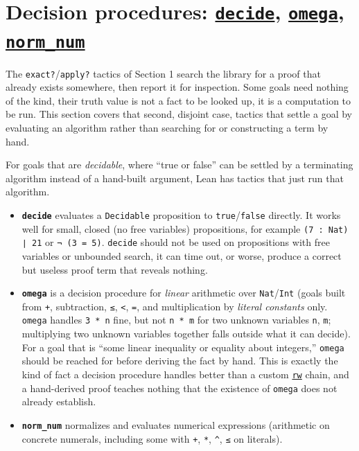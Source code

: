 \section{\texorpdfstring{Decision procedures: \href{https://lean-lang.org/doc/reference/latest/Tactic-Proofs/Tactic-Reference/}{\texttt{decide}}, \href{https://lean-lang.org/doc/reference/latest/Tactic-Proofs/Tactic-Reference/}{\texttt{omega}}, \href{https://lean-lang.org/doc/reference/latest/Tactic-Proofs/Tactic-Reference/}{\texttt{norm\_num}}}{Decision procedures: decide, omega, norm\_num}}\label{sec:13-working-efficiently:02-decision-procedures:1}

The \texttt{exact?}/\texttt{apply?} tactics of Section 1 search the library for a proof that already exists somewhere, then report it for inspection. Some goals need nothing of the kind, their truth value is not a fact to be looked up, it is a computation to be run. This section covers that second, disjoint case, tactics that settle a goal by evaluating an algorithm rather than searching for or constructing a term by hand.

For goals that are \emph{decidable}, where ``true or false'' can be settled by a terminating algorithm instead of a hand-built argument, Lean has tactics that just run that algorithm.

\begin{itemize}
\tightlist
\item
  \textbf{\texttt{decide}} evaluates a \texttt{Decidable} proposition to \texttt{true}/\texttt{false} directly. It works well for small, closed (no free variables) propositions, for example \texttt{(7 : Nat) ∣ 21} or \texttt{¬ (3 = 5)}. \texttt{decide} should not be used on propositions with free variables or unbounded search, it can time out, or worse, produce a correct but useless proof term that reveals nothing.
\item
  \textbf{\texttt{omega}} is a decision procedure for \emph{linear} arithmetic over \texttt{Nat}/\texttt{Int} (goals built from \texttt{+}, subtraction, \texttt{≤}, \texttt{<}, \texttt{=}, and multiplication by \emph{literal constants} only. \texttt{omega} handles \texttt{3 * n} fine, but not \texttt{n * m} for two unknown variables \texttt{n}, \texttt{m}; multiplying two unknown variables together falls outside what it can decide). For a goal that is ``some linear inequality or equality about integers,'' \texttt{omega} should be reached for before deriving the fact by hand. This is exactly the kind of fact a decision procedure handles better than a custom \href{https://lean-lang.org/doc/reference/latest/Tactic-Proofs/Tactic-Reference/}{\texttt{rw}} chain, and a hand-derived proof teaches nothing that the existence of \texttt{omega} does not already establish.
\item
  \textbf{\texttt{norm\_\allowbreak{}num}} normalizes and evaluates numerical expressions (arithmetic on concrete numerals, including some with \texttt{+}, \texttt{*}, \texttt{\^}, \texttt{≤} on literals).
\end{itemize}

